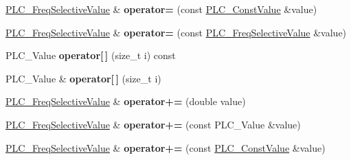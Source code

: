 \begin{DoxyCompactItemize}
\item 
\hypertarget{classns3_1_1PLC__FreqSelectiveValue_af678d7436b33e5da4177aa54f05a33e6}{\hyperlink{classns3_1_1PLC__FreqSelectiveValue}{\-P\-L\-C\-\_\-\-Freq\-Selective\-Value} \& {\bfseries operator=} (const \hyperlink{classns3_1_1PLC__ConstValue}{\-P\-L\-C\-\_\-\-Const\-Value} \&value)}\label{classns3_1_1PLC__FreqSelectiveValue_af678d7436b33e5da4177aa54f05a33e6}

\item 
\hypertarget{classns3_1_1PLC__FreqSelectiveValue_ab19ae53770f92db8899e7fcf8b413d04}{\hyperlink{classns3_1_1PLC__FreqSelectiveValue}{\-P\-L\-C\-\_\-\-Freq\-Selective\-Value} \& {\bfseries operator=} (const \hyperlink{classns3_1_1PLC__FreqSelectiveValue}{\-P\-L\-C\-\_\-\-Freq\-Selective\-Value} \&value)}\label{classns3_1_1PLC__FreqSelectiveValue_ab19ae53770f92db8899e7fcf8b413d04}

\item 
\hypertarget{classns3_1_1PLC__FreqSelectiveValue_acf25196e9c442524c388ab81b2017c36}{\-P\-L\-C\-\_\-\-Value {\bfseries operator\mbox{[}$\,$\mbox{]}} (size\-\_\-t i) const }\label{classns3_1_1PLC__FreqSelectiveValue_acf25196e9c442524c388ab81b2017c36}

\item 
\hypertarget{classns3_1_1PLC__FreqSelectiveValue_af7e7753508101ae58c0cdc17b32197b2}{\-P\-L\-C\-\_\-\-Value \& {\bfseries operator\mbox{[}$\,$\mbox{]}} (size\-\_\-t i)}\label{classns3_1_1PLC__FreqSelectiveValue_af7e7753508101ae58c0cdc17b32197b2}

\item 
\hypertarget{classns3_1_1PLC__FreqSelectiveValue_aa48df97992fee37367d8937513bb5298}{\hyperlink{classns3_1_1PLC__FreqSelectiveValue}{\-P\-L\-C\-\_\-\-Freq\-Selective\-Value} \& {\bfseries operator+=} (double value)}\label{classns3_1_1PLC__FreqSelectiveValue_aa48df97992fee37367d8937513bb5298}

\item 
\hypertarget{classns3_1_1PLC__FreqSelectiveValue_adb97610511053498aaade44f25ec5295}{\hyperlink{classns3_1_1PLC__FreqSelectiveValue}{\-P\-L\-C\-\_\-\-Freq\-Selective\-Value} \& {\bfseries operator+=} (const \-P\-L\-C\-\_\-\-Value \&value)}\label{classns3_1_1PLC__FreqSelectiveValue_adb97610511053498aaade44f25ec5295}

\item 
\hypertarget{classns3_1_1PLC__FreqSelectiveValue_aa4c0c88717834b9a0ea649b61a8d574c}{\hyperlink{classns3_1_1PLC__FreqSelectiveValue}{\-P\-L\-C\-\_\-\-Freq\-Selective\-Value} \& {\bfseries operator+=} (const \hyperlink{classns3_1_1PLC__ConstValue}{\-P\-L\-C\-\_\-\-Const\-Value} \&value)}\label{classns3_1_1PLC__FreqSelectiveValue_aa4c0c88717834b9a0ea649b61a8d574c}


\end{DoxyCompactItemize}
